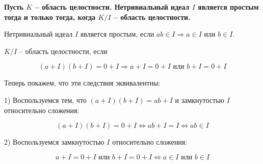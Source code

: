 \textbf{Пусть $K$ -- область целостности. Нетривиальный идеал $I$ является простым тогда и только тогда, когда $K / I$ --  область целостности.}

Нетривиальный идеал $I$ является простым, если 
$ab \in I \Rightarrow a \in I \text{ или } b \in I$.

$K / I$ -- область целостности, если

$$
(a + I)(b + I) = 0 + I \Rightarrow a + I = 0 + I \text{ или } b + I = 0 + I
$$

Теперь покажем, что эти следствия эквивалентны:

1) Воспользуемся тем, что $(a + I)(b + I) = ab + I$ и замкнутостью $I$
относительно сложения:

$$
(a + I)(b + I) = 0 + I \Leftrightarrow ab + I = I \Leftrightarrow 
ab \in I
$$

2) Воспользуемся замкнутостью $I$ относительно сложения:

$$
a + I = 0 + I \text{ или } b + I = 0 + I \Leftrightarrow
a \in I \text{ или } b \in I
$$
